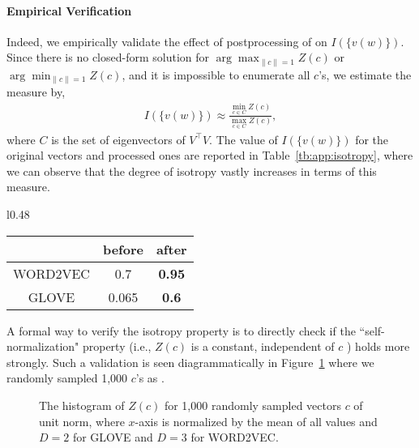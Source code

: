 \documentclass{article} \usepackage{acl2017,times}
\begin{document}
{\paragraph{Empirical Verification} Indeed, we empirically validate the effect of postprocessing of on $I(\{v(w)\})$. Since there is no closed-form solution for $\arg\max_{\|c\|=1}Z(c)$ or $\arg\min_{\|c\|=1} Z(c)$, and it is impossible to enumerate all $c$'s, we estimate the measure by,
\begin{align*}
    I(\{v(w)\}) \approx \frac{\min_{c \in C} Z(c)}{\max_{c \in C} Z(c)},
\end{align*}
where $C$ is the set of eigenvectors of $V^{\top} V$. The value of $I(\{v(w)\})$ for the original vectors and processed ones are reported in Table~\ref{tb:app:isotropy}, where we can observe that the degree of isotropy vastly increases in terms of this measure.

\begin{wraptable}{l}{0.48\textwidth}
\centering
\begin{tabular}{|c|c|c|}
\hline
         & before & after         \\ \hline
WORD2VEC & 0.7    & \textbf{0.95} \\ \hline
GLOVE    & 0.065  & \textbf{0.6}  \\ \hline
\end{tabular}
\caption{Before-After on the measure of isotropy.}
\label{tb:app:isotropy}
\end{wraptable}


A formal way to verify the isotropy property is to directly check if the ``self-normalization" property (i.e., $Z(c)$ is a constant, independent of $c$ \citep{andreas2015and}) holds more strongly. Such a validation is seen diagrammatically in Figure~\ref{app:fig:partition} where we randomly sampled 1,000 $c$'s as \citep{arora2015rand}.  

}

\begin{figure}[!h]
\centering
\vspace{-20pt}
\caption{The histogram of $Z(c)$ for 1,000 randomly sampled vectors $c$ of unit norm, where  $x$-axis is normalized by the mean of all values and $D = 2$ for GLOVE and $D=3$ for  WORD2VEC.}
\label{app:fig:partition}
\end{figure}
\end{document}
